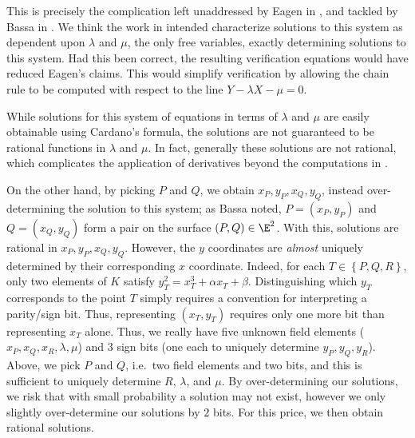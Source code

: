 \documentclass[11pt,letterpaper]{article}
\theoremstyle{definition}
\newcommand{\6}{\mathbf}
\newcommand{\7}{\mathcal}
\begin{document}
This is precisely the complication left unaddressed by Eagen in \cite{Eagen}, and tackled by Bassa in \cite{SoundnessForDLP}.  We think the work in \cite{Eagen} intended  characterize solutions to this system as dependent upon $\lambda$ and $\mu$, the only free variables, exactly determining solutions to this system. Had this been correct, the resulting verification equations would have reduced Eagen's claims. This would simplify verification by allowing the chain rule to be computed with respect to the line $Y - \lambda X - \mu = 0$.

While solutions for this system of equations in terms of $\lambda$ and $\mu$ are easily obtainable using Cardano's formula, the solutions are not guaranteed to be rational functions in $\lambda$ and $\mu$. In fact, generally these solutions are not rational, which complicates the application of derivatives beyond the computations in \cite{Eagen}.

On the other hand, by picking $P$ and $Q$, we obtain $x_P, y_P, x_Q, y_Q$, instead over-determining the solution to this system; as Bassa noted, $P = (x_P, y_P)$ and $Q = (x_Q, y_Q)$ form a pair on the surface $(P, Q) \in \E^2$. With this, solutions are rational in $x_P, y_P, x_Q, y_Q$.
However, the $y$ coordinates are \textit{almost} uniquely determined by their corresponding $x$ coordinate. Indeed, for each $T \in \left\{P, Q, R\right\}$, only two elements of $K$ satisfy $y_T^2 = x_T^3 + \alpha x_T + \beta$. Distinguishing which $y_T$ corresponds to the point $T$ simply requires a convention for interpreting a parity/sign bit.
Thus, representing $(x_T,y_T)$ requires only one more bit than representing $x_T$ alone. Thus, we really have five unknown field elements ($x_P, x_Q, x_R, \lambda, \mu$) and $3$ sign bits (one each to uniquely determine $y_P, y_Q, y_R$). Above, we pick $P$ and $Q$, i.e.\ two field elements and two bits, and this is sufficient to uniquely determine $R$, $\lambda$, and $\mu$. 
By over-determining our solutions, we risk that with small probability a solution may not exist, however we only slightly over-determine our solutions by $2$ bits.
For this price, we then obtain rational solutions. 


\end{document}

